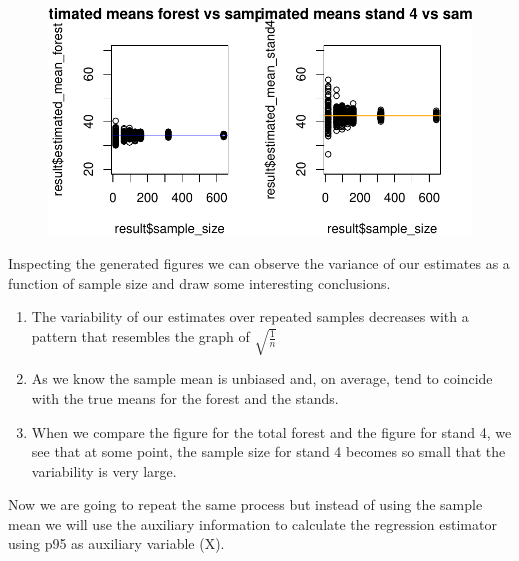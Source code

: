 \documentclass[
  letterpaper,
  DIV=11,
  numbers=noendperiod]{scrartcl}
\begin{document}
\begin{figure}[H]

{\centering \includegraphics{Regression_estimator_files/figure-pdf/unnamed-chunk-4-3.pdf}

}

\end{figure}

Inspecting the generated figures we can observe the variance of our
estimates as a function of sample size and draw some interesting
conclusions.

\begin{enumerate}
\def\labelenumi{\arabic{enumi}.}
\item
  The variability of our estimates over repeated samples decreases with
  a pattern that resembles the graph of \(\sqrt{\frac{1}{n}}\)
\item
  As we know the sample mean is unbiased and, on average, tend to
  coincide with the true means for the forest and the stands.
\item
  When we compare the figure for the total forest and the figure for
  stand 4, we see that at some point, the sample size for stand 4
  becomes so small that the variability is very large.
\end{enumerate}

Now we are going to repeat the same process but instead of using the
sample mean we will use the auxiliary information to calculate the
regression estimator using p95 as auxiliary variable (X).
\end{document}
